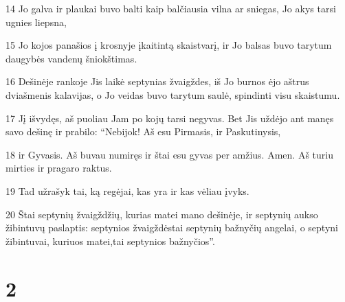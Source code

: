 \par 14 Jo galva ir plaukai buvo balti kaip balčiausia vilna ar sniegas, Jo akys tarsi ugnies liepsna, 
\par 15 Jo kojos panašios į krosnyje įkaitintą skaistvarį, ir Jo balsas buvo tarytum daugybės vandenų šniokštimas. 
\par 16 Dešinėje rankoje Jis laikė septynias žvaigždes, iš Jo burnos ėjo aštrus dviašmenis kalavijas, o Jo veidas buvo tarytum saulė, spindinti visu skaistumu. 
\par 17 Jį išvydęs, aš puoliau Jam po kojų tarsi negyvas. Bet Jis uždėjo ant manęs savo dešinę ir prabilo: “Nebijok! Aš esu Pirmasis, ir Paskutinysis, 
\par 18 ir Gyvasis. Aš buvau numiręs ir štai esu gyvas per amžius. Amen. Aš turiu mirties ir pragaro raktus. 
\par 19 Tad užrašyk tai, ką regėjai, kas yra ir kas vėliau įvyks. 
\par 20 Štai septynių žvaigždžių, kurias matei mano dešinėje, ir septynių aukso žibintuvų paslaptis: septynios žvaigždės­tai septynių bažnyčių angelai, o septyni žibintuvai, kuriuos matei,­tai septynios bažnyčios”.


\chapter{2}


